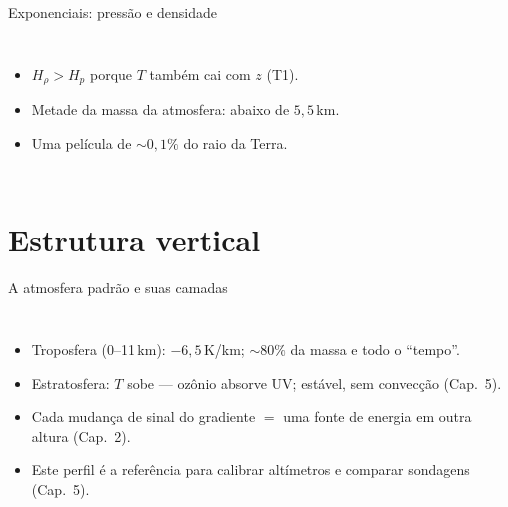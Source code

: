 \documentclass[aspectratio=169,11pt]{beamer}
\begin{document}
\begin{frame}{Exponenciais: pressão e densidade}
  \begin{columns}
    \vspace{0.4em}
    \begin{itemize}
      \item $H_\rho > H_p$ porque $T$ também cai com $z$ (T1).
      \item Metade da massa da atmosfera: abaixo de $5{,}5$\,km.
      \item Uma película de $\sim0{,}1\%$ do raio da Terra.
    \end{itemize}
  \end{columns}
\end{frame}

\section{Estrutura vertical}

\begin{frame}{A atmosfera padrão e suas camadas}
  \begin{columns}
    \begin{itemize}
      \item Troposfera (0--11\,km): $-6{,}5$\,K/km; $\sim80\%$ da massa e
            todo o ``tempo''.
      \item Estratosfera: $T$ sobe — ozônio absorve UV; estável, sem
            convecção (Cap.~5).
      \item Cada mudança de sinal do gradiente $=$ uma \alert{fonte de
            energia} em outra altura (Cap.~2).
      \item Este perfil é a referência para calibrar altímetros e comparar
            sondagens (Cap.~5).
    \end{itemize}
  \end{columns}
\end{frame}
\end{document}
